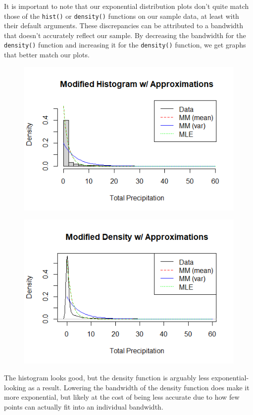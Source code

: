 \documentclass[12pt, a4paper, oneside]{report}
\begin{document}
\newpage
It is important to note that our exponential distribution plots don't quite match those of the \lstinline{hist()} or \lstinline{density()} functions on our sample data, at least with their default arguments. These discrepancies can be attributed to a bandwidth that doesn't accurately reflect our sample. 
By decreasing the bandwidth for the \lstinline{density()} function and increasing it for the \lstinline{density()} function, we get graphs that better match our plots.



\begin{figure}[h]
  \centering
  \includegraphics[width=0.7\linewidth]{expHistModifiedA.png}
\end{figure}

\begin{figure}[h]
  \centering
  \includegraphics[width=0.7\linewidth]{expDensityModifiedA.png}
\end{figure}

\newpage
The histogram looks good, but the density function is arguably less exponential-looking as a result. Lowering the bandwidth of the density function does make it more exponential, but likely at the cost of being less accurate due to how few points can actually fit into an individual bandwidth. 
\end{document}
